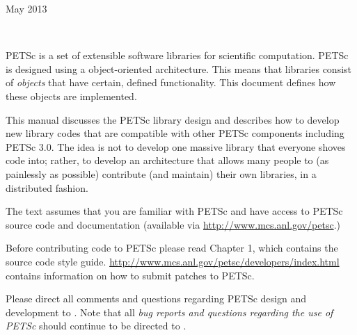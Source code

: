 \documentclass[twoside,12pt]{../sty/report_petsc}
\begin{document}
{}{May 2013}

\newpage

\hbox{ }

\vspace{1in}
\date{\today}


\newpage




\medskip \medskip


%
%

\medskip \medskip
PETSc is
a set of extensible software libraries for scientific computation.
PETSc is designed using a object-oriented
architecture. This means that libraries consist of {\em objects} that
have certain, defined functionality. This document defines how these
objects are implemented.

This manual discusses the PETSc library design and describes
how to develop new library codes that are compatible with other PETSc components
including PETSc 3.0.
The idea is not to develop one massive library that everyone shoves code
into; rather, to develop an architecture that allows many people
to (as painlessly as possible) contribute (and maintain) their own libraries,
in a distributed fashion.

The text assumes
that you are familiar with PETSc and have access to PETSc source code and documentation
(available via \href{http://www.mcs.anl.gov/petsc}{http://www.mcs.anl.gov/petsc}.)

Before contributing code to PETSc please read Chapter 1, which contains the source code style guide.
\href{http://www.mcs.anl.gov/petsc/developers/index.html}{http://www.mcs.anl.gov/petsc/developers/index.html}
contains information on how to submit patches to PETSc.

\vspace{1cm}

Please direct all comments and questions regarding PETSc design and
development to .  Note that all {\em
bug reports and questions regarding the use of PETSc} should continue
to be directed to .

%
%
\end{document}
